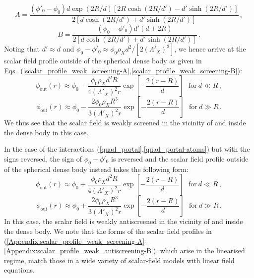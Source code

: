 \documentclass[aps,prd,onecolumn,nofootinbib]{revtex4-2} %
\begin{document}
\begin{equation}
\label{coeffn-A_Weak-A_inside}
A = \frac{ \left( \phi'_0 - \phi_0 \right) d \exp \left( 2R/d \right) \left[ 2R \cosh \left( 2R/d' \right) - d' \sinh \left( 2R/d' \right) \right] }{ 2 \left[ d \cosh \left( 2R/d' \right) + d' \sinh \left( 2R/d' \right) \right] }  \, , 
\end{equation}
\begin{equation}
\label{coeffn-B_Weak-A_inside}
B = \frac{ \left( \phi_0 - \phi'_0 \right) d'  \left( d+2R \right)  }{ 2 \left[ d \cosh \left( 2R/d' \right) + d' \sinh \left( 2R/d' \right) \right] }  \, . 
\end{equation}
Noting that $d' \approx d$ and $\phi_0 - \phi'_0 \approx \phi_0 \rho_X d^2 / [2 ( \Lambda'_X )^2]$, we hence arrive at the scalar field profile outside of the spherical dense body as given in Eqs.~(\ref{scalar_profile_weak_screening-A},\ref{scalar_profile_weak_screening-B}): 
\begin{equation}
\label{Appendix:scalar_profile_weak_screening-A}
\phi_\textrm{out}(r) \approx \phi_0 - \frac{\phi_0 \rho_X d^2 R}{4 \left( \Lambda'_X \right)^2 r} \exp \left[ - \frac{2 \left( r - R \right)}{d} \right] ~~~\textrm{for} ~ d \ll R  \, , 
\end{equation}
\begin{equation}
\label{Appendix:scalar_profile_weak_screening-B}
\phi_\textrm{out}(r) \approx \phi_0 - \frac{2 \phi_0 \rho_X R^3}{3 \left( \Lambda'_X \right)^2 r} \exp \left[ - \frac{2 \left( r - R \right)}{d} \right] ~~~\textrm{for} ~ d \gg R  \, . 
\end{equation}
We thus see that the scalar field is weakly screened in the vicinity of and inside the dense body in this case. 


In the case of the interactions (\ref{quad_portal},\ref{quad_portal-atoms}) but with the signs reversed, the sign of $\phi_0 - \phi'_0$ is reversed and the scalar field profile outside of the spherical dense body instead takes the following form: 
\begin{equation}
\label{Appendix:scalar_profile_weak_antiscreening-A}
\phi_\textrm{out}(r) \approx \phi_0 + \frac{\phi_0 \rho_X d^2 R}{4 \left( \Lambda'_X \right)^2 r} \exp \left[ - \frac{2 \left( r - R \right)}{d} \right] ~~~\textrm{for} ~ d \ll R  \, , 
\end{equation}
\begin{equation}
\label{Appendix:scalar_profile_weak_antiscreening-B}
\phi_\textrm{out}(r) \approx \phi_0 + \frac{2 \phi_0 \rho_X R^3}{3 \left( \Lambda'_X \right)^2 r} \exp \left[ - \frac{2 \left( r - R \right)}{d} \right] ~~~\textrm{for} ~ d \gg R  \, . 
\end{equation}
In this case, the scalar field is weakly antiscreened in the vicinity of and inside the dense body. 
We note that the forms of the scalar field profiles in (\ref{Appendix:scalar_profile_weak_screening-A}--\ref{Appendix:scalar_profile_weak_antiscreening-B}), which arise in the linearised regime, match those in a wide variety of scalar-field models with linear field equations. 
\end{document}
